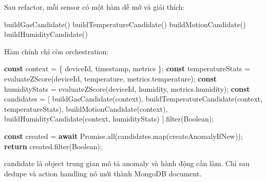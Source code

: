 \documentclass[11pt,oneside,openany]{book}
\renewcommand{\texttt}[1]{{\ttfamily\small #1}}
\newenvironment{Shaded}{\begin{snugshade}}{\end{snugshade}}
\newcommand{\AttributeTok}[1]{\textcolor[rgb]{0.16,0.50,0.73}{#1}}
\newcommand{\BuiltInTok}[1]{\textcolor[rgb]{0.50,0.55,0.55}{#1}}
\newcommand{\ControlFlowTok}[1]{\textcolor[rgb]{0.99,0.74,0.29}{\textbf{#1}}}
\newcommand{\FunctionTok}[1]{\textcolor[rgb]{0.56,0.27,0.68}{#1}}
\newcommand{\KeywordTok}[1]{\textcolor[rgb]{0.81,0.81,0.76}{\textbf{#1}}}
\newcommand{\NormalTok}[1]{\textcolor[rgb]{0.81,0.81,0.76}{#1}}
\newcommand{\OperatorTok}[1]{\textcolor[rgb]{0.81,0.81,0.76}{#1}}
\newcommand{\StringTok}[1]{\textcolor[rgb]{0.96,0.31,0.31}{#1}}
\renewenvironment{Shaded}{%
  \def\FrameCommand{\fboxsep=8pt\colorbox{shadecolor}}%
  \MakeFramed{\advance\hsize-\width\FrameRestore}%
}{\endMakeFramed}
\begin{document}
Sau refactor, mỗi sensor có một hàm dễ mở và giải thích:

\begin{Shaded}
\begin{Highlighting}[]
\NormalTok{buildGasCandidate()}
\NormalTok{buildTemperatureCandidate()}
\NormalTok{buildMotionCandidate()}
\NormalTok{buildHumidityCandidate()}
\end{Highlighting}
\end{Shaded}

Hàm chính chỉ còn orchestration:

\begin{Shaded}
\begin{Highlighting}[]
\KeywordTok{const}\NormalTok{ context }\OperatorTok{=}\NormalTok{ \{ deviceId}\OperatorTok{,}\NormalTok{ timestamp}\OperatorTok{,}\NormalTok{ metrics \}}\OperatorTok{;}
\KeywordTok{const}\NormalTok{ temperatureStats }\OperatorTok{=} \FunctionTok{evaluateZScore}\NormalTok{(deviceId}\OperatorTok{,} \StringTok{\textquotesingle{}temperature\textquotesingle{}}\OperatorTok{,}\NormalTok{ metrics}\OperatorTok{.}\AttributeTok{temperature}\NormalTok{)}\OperatorTok{;}
\KeywordTok{const}\NormalTok{ humidityStats }\OperatorTok{=} \FunctionTok{evaluateZScore}\NormalTok{(deviceId}\OperatorTok{,} \StringTok{\textquotesingle{}humidity\textquotesingle{}}\OperatorTok{,}\NormalTok{ metrics}\OperatorTok{.}\AttributeTok{humidity}\NormalTok{)}\OperatorTok{;}
\KeywordTok{const}\NormalTok{ candidates }\OperatorTok{=}\NormalTok{ [}
  \FunctionTok{buildGasCandidate}\NormalTok{(context)}\OperatorTok{,}
  \FunctionTok{buildTemperatureCandidate}\NormalTok{(context}\OperatorTok{,}\NormalTok{ temperatureStats)}\OperatorTok{,}
  \FunctionTok{buildMotionCandidate}\NormalTok{(context)}\OperatorTok{,}
  \FunctionTok{buildHumidityCandidate}\NormalTok{(context}\OperatorTok{,}\NormalTok{ humidityStats)}
\NormalTok{]}\OperatorTok{.}\FunctionTok{filter}\NormalTok{(}\BuiltInTok{Boolean}\NormalTok{)}\OperatorTok{;}

\KeywordTok{const}\NormalTok{ created }\OperatorTok{=} \ControlFlowTok{await} \BuiltInTok{Promise}\OperatorTok{.}\FunctionTok{all}\NormalTok{(candidates}\OperatorTok{.}\FunctionTok{map}\NormalTok{(createAnomalyIfNew))}\OperatorTok{;}
\ControlFlowTok{return}\NormalTok{ created}\OperatorTok{.}\FunctionTok{filter}\NormalTok{(}\BuiltInTok{Boolean}\NormalTok{)}\OperatorTok{;}
\end{Highlighting}
\end{Shaded}

\texttt{candidate} là object trung gian mô tả anomaly và hành động cần
làm. Chỉ sau dedupe và action handling nó mới thành MongoDB document.
\end{document}
